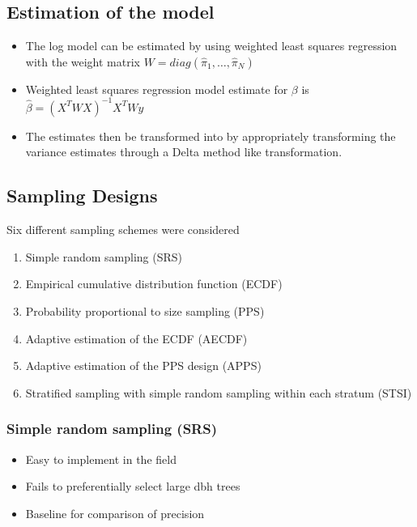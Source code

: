 \documentclass{beamer}
\begin{document}
%
\begin{frame}
  \section{Estimation of the model}
  \begin{itemize}
    \item The log model can be estimated by using weighted least squares regression with the weight matrix $W = diag(\hat{\pi}_1, \ldots, \hat{\pi}_N)$ \vspace{3mm}
    \item Weighted least squares regression model estimate for $\beta$ is $\hat{\beta} = (X^T W X)^{ - 1} X^T W y$ \vspace{3mm}
    \item The estimates then be transformed into by appropriately transforming the variance estimates through a Delta method like transformation.
  \end{itemize}
\end{frame}
%
\begin{frame}
  \section{Sampling Designs}
%
  Six different sampling schemes were considered
  \begin{enumerate}
    \item Simple random sampling (SRS)
    \item Empirical cumulative distribution function (ECDF)
    \item Probability proportional to size sampling (PPS)
    \item Adaptive estimation of the ECDF (AECDF)
    \item Adaptive estimation of the PPS design (APPS)
    \item Stratified sampling with simple random sampling within each stratum (STSI)
  \end{enumerate}
\end{frame}
%
\begin{frame}
  \frametitle{Simple random sampling (SRS)}
  \begin{itemize}
    \item Easy to implement in the field  \vspace{3mm}
    \item Fails to preferentially select large dbh trees \vspace{3mm}
    \item Baseline for comparison of precision 
  \end{itemize}
\end{frame}
\end{document}
